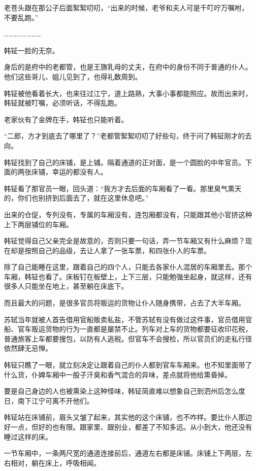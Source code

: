 老苍头跟在那公子后面絮絮叨叨，“出来的时候，老爷和夫人可是千叮咛万嘱咐，不要乱跑。”

……………………

韩钲一脸的无奈。

身后的是府中的老都管，也是王旖乳母的丈夫，在府中的身份不同于普通的仆人。他们这些哥儿、姐儿见到了，也得礼数周到。

韩钲被他看着长大，也来往过江宁，道上路熟，大事小事都能照应。故而出来时，韩钲就被叮嘱，必须听话，不得乱跑。

老家伙有了金牌在手，韩钲也只能听着。

“二郎，方才到底去了哪里了？”老都管絮絮叨叨了好些句，终于问了韩钲刚才的去向。

韩钲找到了自己的床铺，是上铺。隔着通道的正对面，是一个圆脸的中年官员。下面的两张床铺，幸运的都没有人。

韩钲看了那官员一眼，回头道：“我方才去后面的车厢看了一看。那里臭气熏天的，你们也别挤到后面去了，就在这里休息吧。”

出来的仓促，专列没有，专属的车厢没有，连包厢都没有，只能跟其他小官挤这种上下两层铺位的车厢。

韩钲觉得自己父亲完全是故意的，否则只要一句话，弄一节车厢又有什么麻烦？现在却是按照自己的品级，去让人拿了一张车票，和四张仆人的车票。

除了自己能睡在这里，跟着自己的四个人，只能去各家仆人混居的车厢里去。那个车厢，韩钲也看了。床板钉在板壁上，上下三层，只能勉强坐起身，就这样，还有很多人只能坐在地上，甚至躺在床底下。

而且最大的问题，是很多官员将贩运的货物让仆人随身携带，占去了大半车厢。

苏轼当年就被人首告借用官船贩卖私盐，不管苏轼有没有做过这件事，官员借用官船、官车贩运货物的行为一直都是屡禁不止。列车对上车的货物都要征收印花税，普通旅客上车都要搜包，以防有人逃税。但官车不会搜检，所以官员们的走私行径依然肆无忌惮。

韩钲只瞧了一眼，就立刻决定让跟着自己的仆人都到官车车厢来。也不知里面带了什么货，仆婢车厢中一股子汗臭和香气混合的异味，差点就将他给熏昏掉。

要是自己身边的人也被熏染上这种怪味，韩钲简直难以想象自己到泗州后怎么度日，南下江宁可离不开他们。

韩钲站在床铺前，眉头又皱了起来，其实他的这个床铺，也不咋样。要比仆人那边好一点，但好的也有限。跟家里、跟别业，都差了不知多远。从小到大，他还没有睡过这样的床。

一节车厢中，一条两尺宽的通道连接前后，通道左右都是床铺。床铺上下两层，左右相对，躺在床上，呼吸相闻。

